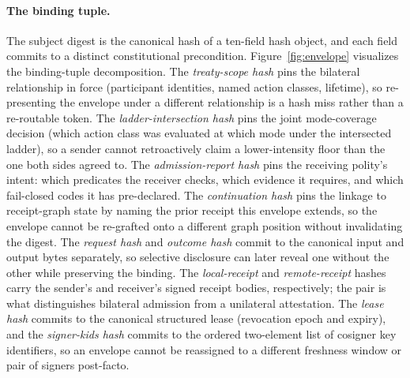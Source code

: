 \paragraph{The binding tuple.} The subject digest is the canonical hash of a ten-field hash object, and each field commits to a distinct constitutional precondition. Figure~\ref{fig:envelope} visualizes the binding-tuple decomposition. The \emph{treaty-scope hash} pins the bilateral relationship in force (participant identities, named action classes, lifetime), so re-presenting the envelope under a different relationship is a hash miss rather than a re-routable token. The \emph{ladder-intersection hash} pins the joint mode-coverage decision (which action class was evaluated at which mode under the intersected ladder), so a sender cannot retroactively claim a lower-intensity floor than the one both sides agreed to. The \emph{admission-report hash} pins the receiving polity's intent: which predicates the receiver checks, which evidence it requires, and which fail-closed codes it has pre-declared. The \emph{continuation hash} pins the linkage to receipt-graph state by naming the prior receipt this envelope extends, so the envelope cannot be re-grafted onto a different graph position without invalidating the digest. The \emph{request hash} and \emph{outcome hash} commit to the canonical input and output bytes separately, so selective disclosure can later reveal one without the other while preserving the binding. The \emph{local-receipt} and \emph{remote-receipt} hashes carry the sender's and receiver's signed receipt bodies, respectively; the pair is what distinguishes bilateral admission from a unilateral attestation. The \emph{lease hash} commits to the canonical structured lease (revocation epoch and expiry), and the \emph{signer-kids hash} commits to the ordered two-element list of cosigner key identifiers, so an envelope cannot be reassigned to a different freshness window or pair of signers post-facto.

